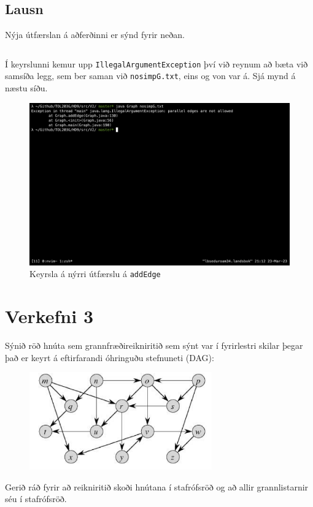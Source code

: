 \documentclass[12pt, a4paper, hidelinks]{article}
\begin{document}
\subsection*{Lausn}
Nýja útfærslan á aðferðinni er sýnd fyrir neðan.
\begin{listing}[H]
\centering
\inputminted[linenos, fontsize=\small,breaklines, firstline=125, lastline=135]{java}{../src/V2/Graph.java} 
\end{listing}
\noindent
Í keyrslunni kemur upp \texttt{IllegalArgumentException} því við reynum að bæta við samsíða legg, sem ber saman við \texttt{nosimpG.txt}, eins og von var á. Sjá mynd á næstu síðu.
\begin{figure}[H]
\centering
\includegraphics[width=\textwidth]{v2_keyrsla.png}
\caption{Keyrsla á nýrri útfærslu á \texttt{addEdge}}
\end{figure}
\newpage

\section*{Verkefni 3}
Sýnið röð hnúta sem grannfræðireikniritið sem sýnt var í fyrirlestri skilar þegar það er keyrt á eftirfarandi óhringuðu stefnuneti (DAG):
\begin{figure}[H]
    \centering
    \includegraphics[width=0.7\textwidth]{v3_mynd.png}
    \end{figure}
\noindent
Gerið ráð fyrir að reikniritið skoði hnútana í stafrófsröð og að allir grannlistarnir séu í stafrófsröð.
\end{document}

